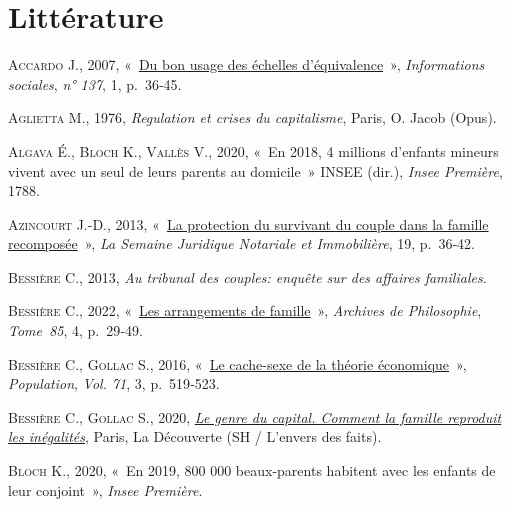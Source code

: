 \documentclass[
  12pt,
]{book}
\newlength{\cslhangindent}
\newenvironment{CSLReferences}[2] %
 {\begin{list}{}{%
  \setlength{\itemindent}{0pt}
  \setlength{\leftmargin}{0pt}
  \setlength{\parsep}{0pt}
  \ifodd #1
   \setlength{\leftmargin}{\cslhangindent}
   \setlength{\itemindent}{-1\cslhangindent}
  \fi
  \setlength{\itemsep}{#2\baselineskip}}}
 {\end{list}}
\begin{document}
\section{Littérature}\label{littuxe9rature}

\setlength{\itemindent}{-.5in}

\label{refs}
\begin{CSLReferences}{0}{1}
\textsc{Accardo J.}, 2007,
{«~\href{https://www.cairn.info/revue-informations-sociales-2007-1-page-36.htm}{Du
bon usage des échelles d'équivalence}~»}, \emph{Informations sociales},
\emph{n° 137}, 1, p.~36‑45.

\textsc{Aglietta M.}, 1976, \emph{Regulation et crises du capitalisme},
Paris, O. Jacob (Opus).

\textsc{Algava É.}, \textsc{Bloch K.}, \textsc{Vallès V.}, 2020, {«~En
2018, 4 millions d{'}enfants mineurs vivent avec un seul de leurs
parents au domicile~»} \textsc{INSEE} (dir.), \emph{Insee Première},
1788.

\textsc{Azincourt J.-D.}, 2013,
{«~\href{https://halshs.archives-ouvertes.fr/halshs-00825353}{La
protection du survivant du couple dans la famille recomposée}~»},
\emph{La Semaine Juridique Notariale et Immobilière}, 19, p.~36‑42.

\textsc{Bessière C.}, 2013, \emph{Au tribunal des couples: enquête sur
des affaires familiales}.

\textsc{Bessière C.}, 2022,
{«~\href{https://doi.org/10.3917/aphi.854.0029}{Les arrangements de
famille}~»}, \emph{Archives de Philosophie}, \emph{Tome~85}, 4,
p.~29‑49.

\textsc{Bessière C.}, \textsc{Gollac S.}, 2016,
{«~\href{https://www.cairn.info/revue-population-2016-3-page-519.htm}{Le
cache-sexe de la théorie économique}~»}, \emph{Population}, \emph{Vol.
71}, 3, p.~519‑523.

\textsc{Bessière C.}, \textsc{Gollac S.}, 2020,
\emph{\href{https://www.cairn.info/le-genre-du-capital--9782348044380.htm}{Le
genre du capital. Comment la famille reproduit les inégalités}}, Paris,
La Découverte (SH / L'envers des faits).

\textsc{Bloch K.}, 2020, {«~En 2019, 800 000 beaux-parents habitent avec
les enfants de leur conjoint~»}, \emph{Insee Première}.


\end{CSLReferences}
\end{document}
